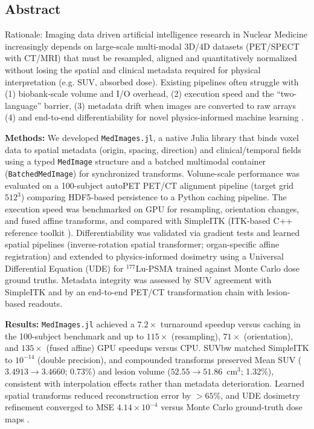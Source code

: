 \documentclass[a4paper,10pt]{elsarticle}
\begin{document}
\subsection*{Abstract}

Rationale: Imaging data driven artificial intelligence research in Nuclear Medicine increasingly depends on large-scale multi-modal 3D/4D datasets (PET/SPECT with CT/MRI) that must be resampled, aligned and quantitatively normalized without losing the spatial and clinical metadata required for physical interpretation (e.g. SUV, absorbed dose). Existing pipelines often struggle with (1) biobank-scale volume and I/O overhead, (2) execution speed and the ``two-language'' barrier, (3) metadata drift when images are converted to raw arrays (4) and end-to-end differentiability for novel physics-informed machine learning  \cite{JhaBradshaw2022}.

\textbf{Methods:} We developed \texttt{MedImages.jl}, a native Julia library that binds voxel data to spatial metadata (origin, spacing, direction) and clinical/temporal fields using a typed \texttt{MedImage} structure and a batched multimodal container (\texttt{BatchedMedImage}) for synchronized transforms. Volume-scale performance was evaluated on a 100-subject autoPET PET/CT alignment pipeline (target grid $512^3$) comparing HDF5-based persistence to a Python caching pipeline. The execution speed was benchmarked on GPU for resampling, orientation changes, and fused affine transforms, and compared with SimpleITK (ITK-based C++ reference toolkit  \cite{LowekampChen2013}). Differentiability was validated via gradient tests and learned spatial pipelines (inverse-rotation spatial transformer; organ-specific affine registration) and extended to physics-informed dosimetry using a Universal Differential Equation (UDE) for $^{177}$Lu-PSMA trained against Monte Carlo dose ground truths. Metadata integrity was assessed by SUV agreement with SimpleITK and by an end-to-end PET/CT transformation chain with lesion-based readouts.

\textbf{Results:} \texttt{MedImages.jl} achieved a $7.2\times$ turnaround speedup versus caching in the 100-subject benchmark and up to $115\times$ (resampling), $71\times$ (orientation), and $135\times$ (fused affine) GPU speedups versus CPU. SUVbw matched SimpleITK to $10^{-14}$ (double precision), and compounded transforms preserved Mean SUV ($3.4913 \rightarrow 3.4660$; 0.73\%) and lesion volume ($52.55 \rightarrow 51.86$~cm$^3$; 1.32\%), consistent with interpolation effects rather than metadata deterioration. Learned spatial transforms reduced reconstruction error by $>65$\%, and UDE dosimetry refinement converged to MSE $4.14\times10^{-4}$ versus Monte Carlo ground-truth dose maps  \cite{XueGafita2024}.
\end{document}
